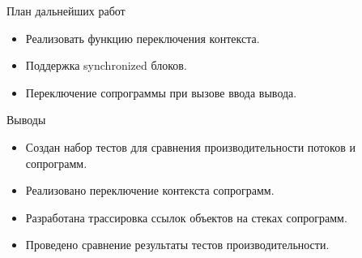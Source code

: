 \begin{frame}{План дальнейших работ} 
	\begin{itemize}
		\item Реализовать функцию переключения контекста.
		\item Поддержка synchronized блоков.
		\item Переключение сопрограммы при вызове ввода вывода.
	\end{itemize}
\end{frame}

\begin{frame}{Выводы}
	\begin{itemize}
		\item Создан набор тестов для сравнения производительности потоков и сопрограмм.
		\item Реализовано переключение контекста сопрограмм.
		\item Разработана трассировка ссылок объектов на стеках сопрограмм.
		\item Проведено сравнение результаты тестов производительности.
	\end{itemize}
\end{frame}


